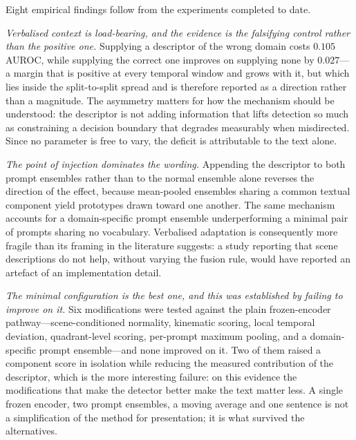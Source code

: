 \documentclass[a4paper,fleqn]{cas-sc}
\begin{document}
Eight empirical findings follow from the experiments completed to date.

\emph{Verbalised context is load-bearing, and the evidence is the falsifying
control rather than the positive one.} Supplying a descriptor of the wrong
domain costs $0.105$ AUROC, while supplying the correct one improves on
supplying none by $0.027$---a margin that is positive at every temporal window
and grows with it, but which lies inside the split-to-split spread and is
therefore reported as a direction rather than a magnitude. The asymmetry matters
for how the mechanism should be understood: the descriptor is not adding
information that lifts detection so much as constraining a decision boundary
that degrades measurably when misdirected. Since no parameter is free to vary,
the deficit is attributable to the text alone.

\emph{The point of injection dominates the wording.} Appending the descriptor to
both prompt ensembles rather than to the normal ensemble alone reverses the
direction of the effect, because mean-pooled ensembles sharing a common textual
component yield prototypes drawn toward one another. The same mechanism accounts
for a domain-specific prompt ensemble underperforming a minimal pair of prompts
sharing no vocabulary. Verbalised adaptation is consequently more fragile than
its framing in the literature suggests: a study reporting that scene
descriptions do not help, without varying the fusion rule, would have reported
an artefact of an implementation detail.

\emph{The minimal configuration is the best one, and this was established by
failing to improve on it.} Six modifications were tested against the plain
frozen-encoder pathway---scene-conditioned normality, kinematic scoring, local
temporal deviation, quadrant-level scoring, per-prompt maximum pooling, and a
domain-specific prompt ensemble---and none improved on it. Two of them raised a
component score in isolation while reducing the measured contribution of the
descriptor, which is the more interesting failure: on this evidence the
modifications that make the detector better make the text matter less. A single
frozen encoder, two prompt ensembles, a moving average and one sentence is not a
simplification of the method for presentation; it is what survived the
alternatives.
\end{document}
